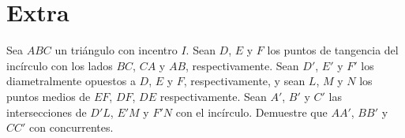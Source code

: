 \section{Extra}

\begin{section-problem}
    Sea $ABC$ un triángulo con incentro $I$.
    Sean $D$, $E$ y $F$ los puntos de tangencia del incírculo con los lados $BC$, $CA$ y $AB$, respectivamente.
    Sean $D'$, $E'$ y $F'$ los diametralmente opuestos a $D$, $E$ y $F$, respectivamente, y sean $L$, $M$ y $N$ los puntos medios de $EF$, $DF$, $DE$ respectivamente.
    Sean $A'$, $B'$ y $C'$ las intersecciones de $D'L$, $E'M$ y $F'N$ con el incírculo.
    Demuestre que $AA'$, $BB'$ y $CC'$ con concurrentes.
\end{section-problem}
